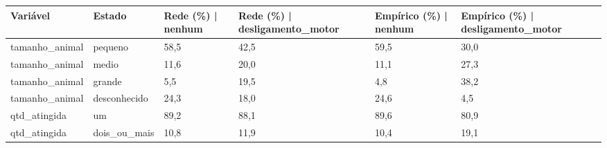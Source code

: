 \begin{tabular}{llllll}
\toprule
Variável & Estado & Rede (\%) | nenhum & Rede (\%) | desligamento\_motor & Empírico (\%) | nenhum & Empírico (\%) | desligamento\_motor \\
\midrule
tamanho\_animal & pequeno & 58,5 & 42,5 & 59,5 & 30,0 \\
tamanho\_animal & medio & 11,6 & 20,0 & 11,1 & 27,3 \\
tamanho\_animal & grande & 5,5 & 19,5 & 4,8 & 38,2 \\
tamanho\_animal & desconhecido & 24,3 & 18,0 & 24,6 & 4,5 \\
qtd\_atingida & um & 89,2 & 88,1 & 89,6 & 80,9 \\
qtd\_atingida & dois\_ou\_mais & 10,8 & 11,9 & 10,4 & 19,1 \\
\bottomrule
\end{tabular}
